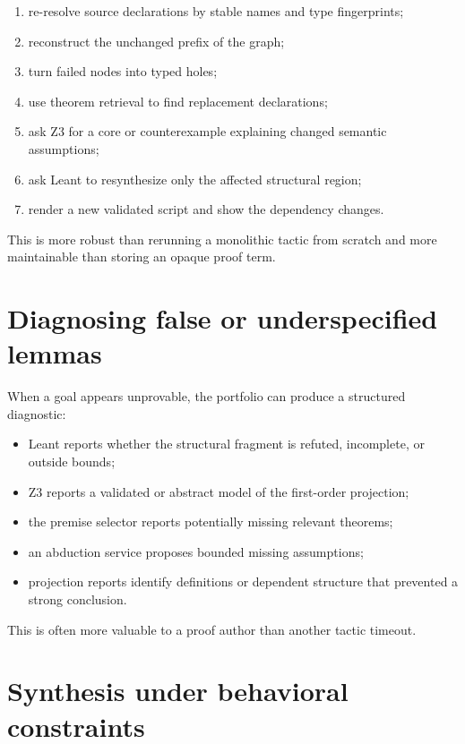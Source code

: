 \documentclass[11pt,letterpaper,openany]{report}
\begin{document}
\begin{enumerate}
  \item re-resolve source declarations by stable names and type fingerprints;
  \item reconstruct the unchanged prefix of the graph;
  \item turn failed nodes into typed holes;
  \item use theorem retrieval to find replacement declarations;
  \item ask Z3 for a core or counterexample explaining changed semantic assumptions;
  \item ask Leant to resynthesize only the affected structural region;
  \item render a new validated script and show the dependency changes.
\end{enumerate}

This is more robust than rerunning a monolithic tactic from scratch and more
maintainable than storing an opaque proof term.

\section{Diagnosing false or underspecified lemmas}

When a goal appears unprovable, the portfolio can produce a structured diagnostic:

\begin{itemize}
  \item Leant reports whether the structural fragment is refuted, incomplete, or
        outside bounds;
  \item Z3 reports a validated or abstract model of the first-order projection;
  \item the premise selector reports potentially missing relevant theorems;
  \item an abduction service proposes bounded missing assumptions;
  \item projection reports identify definitions or dependent structure that prevented
        a strong conclusion.
\end{itemize}

This is often more valuable to a proof author than another tactic timeout.

\section{Synthesis under behavioral constraints}
\end{document}
